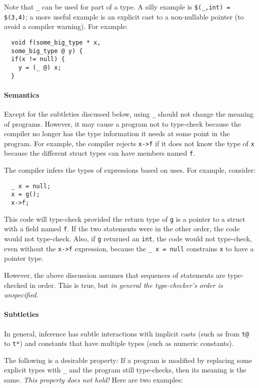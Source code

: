 Note that \texttt{_} can be used for part of a type.  A silly example is
\texttt{\$(_,int) = \$(3,4)}; a more useful example is an explicit cast to
a non-nullable pointer (to avoid a compiler warning).  For example:
\begin{verbatim}
  void f(some_big_type * x,
  some_big_type @ y) {
  if(x != null) {
    y = (_ @) x;
  }
\end{verbatim}

\paragraph{Semantics}
Except for the subtleties discussed below, using \texttt{_} should not change the
meaning of programs.  However, it may cause a program not to type-check
because the compiler no longer has the type information it needs at some point
in the program.  For example, the compiler rejects \texttt{x->f} if it does not
know the type of \texttt{x} because the different struct types can have
members named \texttt{f}. 

The compiler infers the types of expressions based on uses.  For
example, consider:
\begin{verbatim}
  _ x = null;
  x = g();
  x->f;
\end{verbatim}
This code will type-check provided the return type of \texttt{g} is a
pointer to a struct with a field named \texttt{f}.  If the two
statements were in the other order, the code would not type-check. 
Also, if \texttt{g} returned an \texttt{int}, the code would not
type-check, even without the \texttt{x->f} expression, because the
\texttt{_ x = null} constrains \texttt{x} to have a pointer type.

However, the above discussion assumes that sequences of statements are
type-checked in order.  This is true, but \emph{in general the
  type-checker's order is unspecified}.

\paragraph{Subtleties}
In general, inference has subtle interactions with implicit casts
(such as from \texttt{t@} to \texttt{t*}) and constants that have multiple
types (such as numeric constants).

The following is a desirable property: If a program is modified by
replacing some explicit types with \texttt{_} and the program still
type-checks, then its meaning is the same.  \emph{This property does
  not hold!}  Here are two examples:

